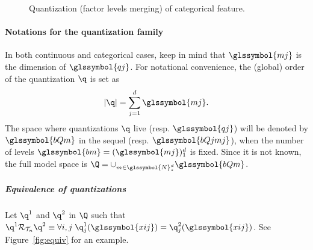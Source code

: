 \begin{figure}[!ht]
\begin{multicols}{2}
\begin{minipage}{0.45\textwidth}
\centering
{}
\caption{\label{fig:disc_disc} Quantization (factor levels merging) of categorical feature.}
\end{minipage}
\end{multicols}
\end{figure}


\paragraph{Notations for the quantization family}

In both continuous and categorical cases, keep in mind that $\glssymbol{mj}$ is the dimension of $\glssymbol{qj}$. For notational convenience, the (global) order of the quantization $\q$ is set as 
\[|\q|=\sum_{j=1}^d \glssymbol{mj}.\]
The space where quantizations $\q$ live (resp. $\glssymbol{qj}$) will be denoted by $\glssymbol{bQm}$ in the sequel (resp. $\glssymbol{bQjmj}$), when the number of levels $\glssymbol{bm} = (\glssymbol{mj})_1^d$ is fixed. Since it is not known, the full model space is $\Q = \cup_{m \in \glssymbol{N}_\star^{d}} \glssymbol{bQm}$.

\subparagraph{Equivalence of quantizations} \label{par:equiv}

Let $\q^1$ and $\q^2$ in $\Q$ such that $\q^1 \mathcal{R}_{\mathcal{T}_n} \q^2 \equiv \forall i,j \; \q^1_j(\glssymbol{xij}) = \q^2_j(\glssymbol{xij})$. See Figure~\ref{fig:equiv} for an example.

